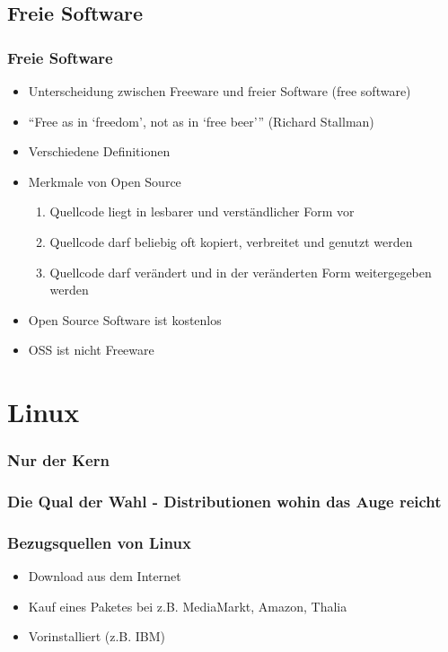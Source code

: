 \documentclass[]{beamer}
\begin{document}
\subsection{Freie Software}
\begin{frame}
	\frametitle{Freie Software}
	\begin{itemize}
		\item Unterscheidung zwischen Freeware und freier 
			Software (free software)
		\item “Free as in ‘freedom’, not as in ‘free beer’”
			(Richard Stallman)
		\item Verschiedene Definitionen 
		\item Merkmale von Open Source
		\begin{enumerate}
			\item Quellcode liegt in lesbarer und verständlicher Form vor
			\item Quellcode darf beliebig oft kopiert, verbreitet und 
				genutzt werden
			\item Quellcode darf verändert und in der veränderten Form 
				weitergegeben werden
		\end{enumerate}
		\item Open Source Software ist kostenlos
		\item OSS ist nicht Freeware
	\end{itemize}
\end{frame}

\section{Linux}

\begin{frame}
	\frametitle{Nur der Kern}
\end{frame}

\begin{frame}
	\frametitle{Die Qual der Wahl - Distributionen wohin das Auge reicht}
\end{frame}

\begin{frame}
	\frametitle{Bezugsquellen von Linux}
	\begin{itemize}
		\item Download aus dem Internet
		\item Kauf eines Paketes bei z.B. MediaMarkt, Amazon, Thalia
		\item Vorinstalliert (z.B. IBM)
	\end{itemize}
\end{frame}
\end{document}
